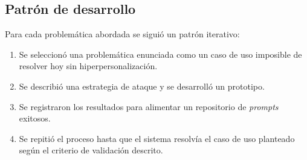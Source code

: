 \subsection{Patrón de desarrollo}

Para cada problemática abordada se siguió un patrón iterativo:

\begin{enumerate}
	\item Se seleccionó una problemática enunciada como un caso de uso imposible de resolver hoy sin hiperpersonalización.
	\item Se describió una estrategia de ataque y se desarrolló un prototipo.
	\item Se registraron los resultados para alimentar un repositorio de \textit{prompts} exitosos.
	\item Se repitió el proceso hasta que el sistema resolvía el caso de uso planteado según el criterio de validación descrito.
\end{enumerate}
